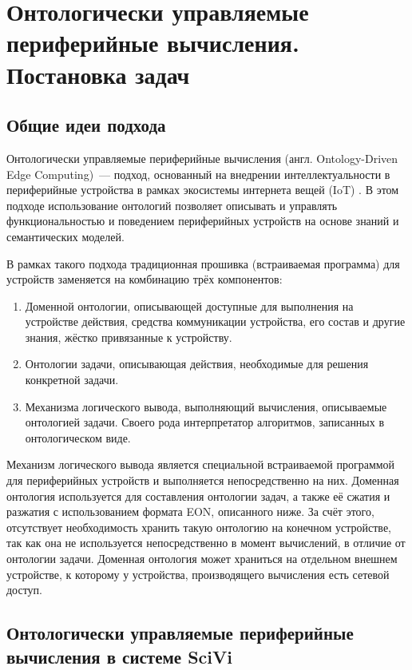 \chapter{Онтологически управляемые периферийные вычисления. Постановка задач}

\section{Общие идеи подхода}

Онтологически управляемые периферийные вычисления (англ. Ontology-Driven Edge Computing)~--- подход, основанный на внедрении интеллектуальности в периферийные устройства в рамках экосистемы интернета вещей (IoT) \cite{incollection:onto-reasoning-on-mcu}.
В этом подходе использование онтологий позволяет описывать и управлять функциональностью и поведением периферийных устройств на основе знаний и семантических моделей.

В рамках такого подхода традиционная прошивка (встраиваемая программа) для устройств заменяется на комбинацию трёх компонентов:
\begin{enumerate}
	\item Доменной онтологии, описывающей доступные для выполнения на устройстве действия, средства коммуникации устройства, его состав и другие знания, жёстко привязанные к устройству.
	\item Онтологии задачи, описывающая действия, необходимые для решения конкретной задачи.
	\item Механизма логического вывода, выполняющий вычисления, описываемые онтологией задачи.
	Своего рода интерпретатор алгоритмов, записанных в онтологическом виде.
\end{enumerate}

Механизм логического вывода является специальной встраиваемой программой для периферийных устройств и выполняется непосредственно на них.
Доменная онтология используется для составления онтологии задач, а также её сжатия и разжатия с использованием формата EON, описанного ниже.
За счёт этого, отсутствует необходимость хранить такую онтологию на конечном устройстве, так как она не используется непосредственно в момент вычислений, в отличие от онтологии задачи.
Доменная онтология может храниться на отдельном внешнем устройстве, к которому у устройства, производящего вычисления есть сетевой доступ.

\section{Онтологически управляемые периферийные вычисления в системе SciVi}

